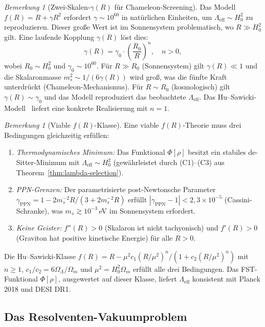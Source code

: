 \documentclass[12pt,a4paper]{article}
\theoremstyle{definition}
\theoremstyle{plain}
\theoremstyle{remark}
\newtheorem{remark}[definition]{Bemerkung}
\begin{document}
\begin{remark}[Zwei-Skalen-$\gamma(R)$ f\"ur Chameleon-Screening]
\label{rem:two-scale-gamma}
Das Modell $f(R) = R + \gamma R^2$ erfordert $\gamma \sim 10^{60}$ in nat\"urlichen Einheiten, um $\Lambda_{\mathrm{eff}} \sim H_0^2$ zu reproduzieren. Dieser gro\ss e Wert ist im Sonnensystem problematisch, wo $R \gg H_0^2$ gilt. Eine laufende Kopplung $\gamma(R)$ l\"ost dies:
\[
\gamma(R) = \gamma_0 \cdot \left(\frac{R_0}{R}\right)^n, \quad n > 0,
\]
wobei $R_0 \sim H_0^2$ und $\gamma_0 \sim 10^{60}$. F\"ur $R \gg R_0$ (Sonnensystem) gilt $\gamma(R) \ll 1$ und die Skalaronmasse $m_s^2 \sim 1/(6\gamma(R))$ wird gro\ss, was die f\"unfte Kraft unterdr\"uckt (Chameleon-Mechanismus). F\"ur $R \sim R_0$ (kosmologisch) gilt $\gamma(R) \sim \gamma_0$ und das Modell reproduziert das beobachtete $\Lambda_{\mathrm{eff}}$. Das Hu--Sawicki-Modell~\cite{HuSawicki2007} liefert eine konkrete Realisierung mit $n = 1$.
\end{remark}

\begin{remark}[Viable $f(R)$-Klasse]
\label{rem:viable-fR}
Eine viable $f(R)$-Theorie muss drei Bedingungen gleichzeitig erf\"ullen:
\begin{enumerate}
\item \emph{Thermodynamisches Minimum:} Das Funktional $\Phi[\rho]$ besitzt ein stabiles de-Sitter-Minimum mit $\Lambda_{\mathrm{eff}} \sim H_0^2$ (gew\"ahrleistet durch (C1)--(C3) aus Theorem~\ref{thm:lambda-selection}).
\item \emph{PPN-Grenzen:} Der parametrisierte post-Newtonsche Parameter $\gamma_{\mathrm{PPN}} = 1 - 2m_s^{-2} R / (3 + 2m_s^{-2} R)$ erf\"ullt $|\gamma_{\mathrm{PPN}} - 1| < 2{,}3 \times 10^{-5}$ (Cassini-Schranke), was $m_s \gtrsim 10^{-3}$\,eV im Sonnensystem erfordert.
\item \emph{Keine Geister:} $f''(R) > 0$ (Skalaron ist nicht tachyonisch) und $f'(R) > 0$ (Graviton hat positive kinetische Energie) f\"ur alle $R > 0$.
\end{enumerate}
Die Hu--Sawicki-Klasse $f(R) = R - \mu^2 c_1 (R/\mu^2)^n / (1 + c_2 (R/\mu^2)^n)$ mit $n \geq 1$, $c_1/c_2 = 6\Omega_\Lambda/\Omega_m$ und $\mu^2 = H_0^2 \Omega_m$ erf\"ullt alle drei Bedingungen. Das FST-Funktional $\Phi[\rho]$, ausgewertet auf dieser Klasse, liefert $\Lambda_{\mathrm{eff}}$ konsistent mit Planck 2018 und DESI DR1.
\end{remark}

\subsection{Das Resolventen-Vakuumproblem}\label{sec:resolvent-vacuum}
\end{document}
